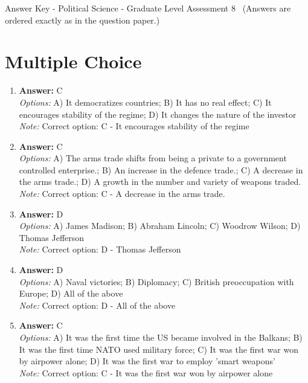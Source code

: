 \documentclass[12pt]{article}
\begin{document}
\begin{center}
Answer Key - Political Science - Graduate Level Assessment 8 \
\small (Answers are ordered exactly as in the question paper.)
\end{center}

\section*{Multiple Choice}
\begin{enumerate}[label=\arabic*.]
\item \textbf{Answer:} C
\\ \textit{Options:} A) It democratizes countries; B) It has no real effect; C) It encourages stability of the regime; D) It changes the nature of the investor
\\ \textit{Note:} Correct option: C - It encourages stability of the regime
\item \textbf{Answer:} C
\\ \textit{Options:} A) The arms trade shifts from being a private to a government controlled enterprise.; B) An increase in the defence trade.; C) A decrease in the arms trade.; D) A growth in the number and variety of weapons traded.
\\ \textit{Note:} Correct option: C - A decrease in the arms trade.
\item \textbf{Answer:} D
\\ \textit{Options:} A) James Madison; B) Abraham Lincoln; C) Woodrow Wilson; D) Thomas Jefferson
\\ \textit{Note:} Correct option: D - Thomas Jefferson
\item \textbf{Answer:} D
\\ \textit{Options:} A) Naval victories; B) Diplomacy; C) British preoccupation with Europe; D) All of the above
\\ \textit{Note:} Correct option: D - All of the above
\item \textbf{Answer:} C
\\ \textit{Options:} A) It was the first time the US became involved in the Balkans; B) It was the first time NATO used military force; C) It was the first war won by airpower alone; D) It was the first war to employ 'smart weapons'
\\ \textit{Note:} Correct option: C - It was the first war won by airpower alone
\end{enumerate}
\end{document}
